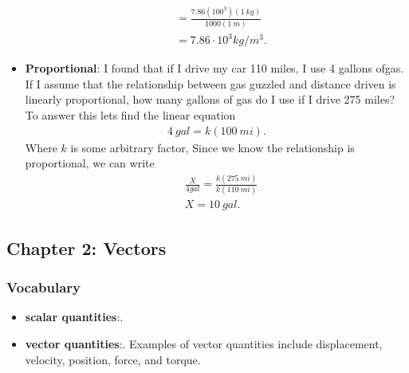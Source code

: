 \documentclass{report}
\begin{document}
\begin{itemize}
\begin{align*}
            &= \frac{7.86(100^{3})(1\ kg)}{1000(1\ m)} \\
            &=7.86 \cdot 10^{3} kg/m^{3}
        .\end{align*}
    \item \textbf{Proportional}: I found that if I drive my car 110 miles, I use 4 gallons ofgas. If I assume that the relationship between gas guzzled and distance driven is linearly proportional, how many gallons of gas do I use if I drive 275 miles?
        \bigbreak \noindent 
        To answer this lets find the linear equation
        \begin{align*}
            4\ gal = k(100\ mi)
        .\end{align*}
        Where $k$ is some arbitrary factor, Since we know the relationship is proportional, we can write 
        \begin{align*}
            &\frac{X}{4 gal} = \frac{k(275\ mi)}{k(110\ mi)} \\
            &X=10\ gal
        .\end{align*}

    \end{itemize}

    \pagebreak 
    \subsection{Chapter 2: Vectors}

    \smallbreak \noindent
    \subsubsection{Vocabulary}
    \begin{itemize}
        \item \textbf{scalar quantities}:.
        \item \textbf{vector quantities}:. Examples of vector quantities include displacement, velocity, position, force, and torque.
    \end{itemize}

    \pagebreak 
\end{document}
